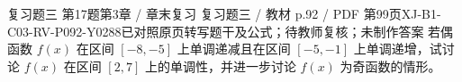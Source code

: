 \par\noindent\begin{minipage}{\linewidth}
\begin{bankitem}{复习题三 第17题}{第3章 / 章末复习 复习题三 / 教材 p.92 / PDF 第99页}{XJ-B1-C03-RV-P092-Y0288}{已对照原页转写题干及公式；待教师复核；未制作答案}
若偶函数 $f(x)$ 在区间 $[-8,-5]$ 上单调递减且在区间 $[-5,-1]$ 上单调递增，试讨论 $f(x)$ 在区间 $[2,7]$ 上的单调性，并进一步讨论 $f(x)$ 为奇函数的情形。
\end{bankitem}
\end{minipage}\par\medskip
